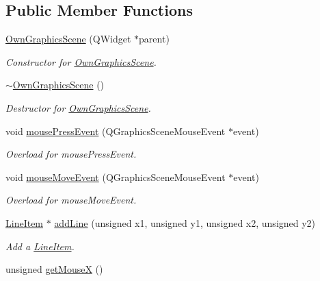 \subsection*{Public Member Functions}
\begin{DoxyCompactItemize}
\item 
\mbox{\hyperlink{classOwnGraphicsScene_a242b82147a469314e4c7fb5af69c265f}{Own\+Graphics\+Scene}} (Q\+Widget $\ast$parent)
\begin{DoxyCompactList}\small\item\em Constructor for \mbox{\hyperlink{classOwnGraphicsScene}{Own\+Graphics\+Scene}}. \end{DoxyCompactList}\item 
\mbox{\label{classOwnGraphicsScene_a4c77674db1854f2b228c7aefbd9ea688}} 
\mbox{\hyperlink{classOwnGraphicsScene_a4c77674db1854f2b228c7aefbd9ea688}{$\sim$\+Own\+Graphics\+Scene}} ()
\begin{DoxyCompactList}\small\item\em Destructor for \mbox{\hyperlink{classOwnGraphicsScene}{Own\+Graphics\+Scene}}. \end{DoxyCompactList}\item 
void \mbox{\hyperlink{classOwnGraphicsScene_a1a9916971af608d5331483606f72fbe4}{mouse\+Press\+Event}} (Q\+Graphics\+Scene\+Mouse\+Event $\ast$event)
\begin{DoxyCompactList}\small\item\em Overload for mouse\+Press\+Event. \end{DoxyCompactList}\item 
void \mbox{\hyperlink{classOwnGraphicsScene_ac7f6be2800f09463413459fed74bf34e}{mouse\+Move\+Event}} (Q\+Graphics\+Scene\+Mouse\+Event $\ast$event)
\begin{DoxyCompactList}\small\item\em Overload for mouse\+Move\+Event. \end{DoxyCompactList}\item 
\mbox{\hyperlink{classLineItem}{Line\+Item}} $\ast$ \mbox{\hyperlink{classOwnGraphicsScene_a4251b836ee575083f4eeaa73254723f4}{add\+Line}} (unsigned x1, unsigned y1, unsigned x2, unsigned y2)
\begin{DoxyCompactList}\small\item\em Add a \mbox{\hyperlink{classLineItem}{Line\+Item}}. \end{DoxyCompactList}\item 
unsigned \mbox{\hyperlink{classOwnGraphicsScene_a6e54bd43db758bcd4f7cc1dd4544232e}{get\+MouseX}} ()

\end{DoxyCompactItemize}
